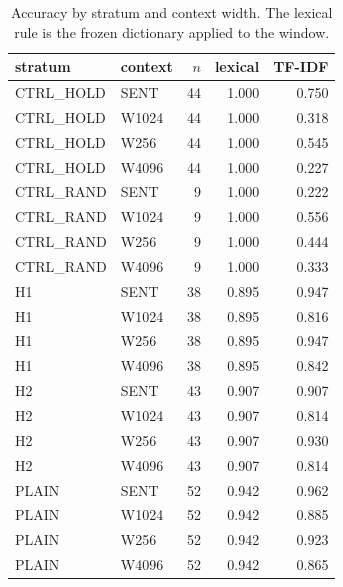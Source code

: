 \begin{table}[t]
\centering\small
\begin{tabular}{llrrr}
\toprule
stratum & context & $n$ & lexical & TF-IDF \\
\midrule
CTRL\_HOLD & SENT & 44 & 1.000 & 0.750 \\
CTRL\_HOLD & W1024 & 44 & 1.000 & 0.318 \\
CTRL\_HOLD & W256 & 44 & 1.000 & 0.545 \\
CTRL\_HOLD & W4096 & 44 & 1.000 & 0.227 \\
CTRL\_RAND & SENT & 9 & 1.000 & 0.222 \\
CTRL\_RAND & W1024 & 9 & 1.000 & 0.556 \\
CTRL\_RAND & W256 & 9 & 1.000 & 0.444 \\
CTRL\_RAND & W4096 & 9 & 1.000 & 0.333 \\
H1 & SENT & 38 & 0.895 & 0.947 \\
H1 & W1024 & 38 & 0.895 & 0.816 \\
H1 & W256 & 38 & 0.895 & 0.947 \\
H1 & W4096 & 38 & 0.895 & 0.842 \\
H2 & SENT & 43 & 0.907 & 0.907 \\
H2 & W1024 & 43 & 0.907 & 0.814 \\
H2 & W256 & 43 & 0.907 & 0.930 \\
H2 & W4096 & 43 & 0.907 & 0.814 \\
PLAIN & SENT & 52 & 0.942 & 0.962 \\
PLAIN & W1024 & 52 & 0.942 & 0.885 \\
PLAIN & W256 & 52 & 0.942 & 0.923 \\
PLAIN & W4096 & 52 & 0.942 & 0.865 \\
\bottomrule
\end{tabular}
\caption{Accuracy by stratum and context width. The lexical rule is the frozen dictionary applied to the window.}
\label{tab:stratacc}
\end{table}
